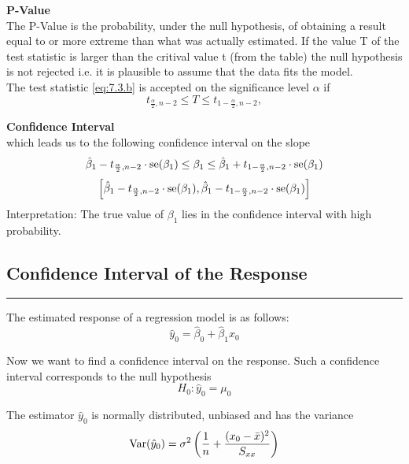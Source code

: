 \textbf{P-Value}\\
The P-Value is the probability, under the null hypothesis, of obtaining a result equal to or more extreme than what was actually estimated. If the value T of the test statistic is larger than the critival value t (from the table) the null hypothesis is not rejected i.e. it is plausible to assume that the data fits the model.\\

The test statistic \ref{eq:7.3.b} is accepted on the significance level $\alpha$ if
\begin{equation}
  t_{\frac{\alpha}{2}, n-2} \leq T \leq t_{1-\frac{\alpha}{2}, n-2},
\end{equation}

\textbf{Confidence Interval}\\
which leads us to the following confidence interval on the slope
\begin{equation}
  \hat{\beta}_1 - t_{\frac{\alpha}{2}, n-2} \cdot \textup{se}(\beta_1)
  \leq \beta_1 \leq
  \hat{\beta}_1 + t_{1-\frac{\alpha}{2}, n-2} \cdot \textup{se}(\beta_1)
\end{equation}
\begin{equation}
  \left[
  \hat{\beta}_1 - t_{\frac{\alpha}{2}, n-2} \cdot \textup{se}(\beta_1),
  \hat{\beta}_1 - t_{1-\frac{\alpha}{2}, n-2} \cdot \textup{se}(\beta_1)\right]
\end{equation}
Interpretation: The true value of $\beta_1$ lies in the confidence interval with high probability.

\subsection{Confidence Interval of the Response}
\noindent\rule[\linienAbstand]{\linewidth}{\linienDicke}
The estimated response of a regression model is as follows:
\begin{equation}
  \hat{y}_0 = \hat{\beta}_0 +  \hat{\beta}_1 x_0
\end{equation}

Now we want to find a confidence interval on the response. Such a confidence interval corresponds to the null hypothesis
\begin{equation}
  H_0: \hat{y}_0 = \mu_0
\end{equation}

The estimator $\hat{y}_0$ is normally distributed, unbiased and has the variance
\begin{equation}
  \textup{Var}(\hat{y}_0) = \sigma^2\left(\frac{1}{n} + \frac{(x_0 - \bar{x})^2}{S_{xx}}\right)
\end{equation}


